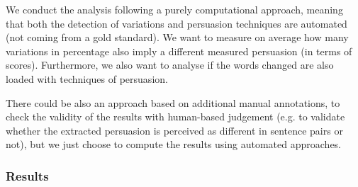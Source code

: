 We conduct the analysis following a purely computational approach, meaning that both the detection of variations and persuasion techniques are automated (not coming from a gold standard).
%
We want to measure on average how many variations in percentage also imply a different measured persuasion (in terms of scores). %
Furthermore, we also want to analyse if the words changed are also loaded with techniques of persuasion.

There could be also an approach based on additional manual annotations, to check the validity of the results with human-based judgement (e.g. to validate whether the extracted persuasion is perceived as different in sentence pairs or not), but we just choose to compute the results using automated approaches.



\subsubsection{Results}
\label{ssec:lp_relationship_small_variations_quant}


